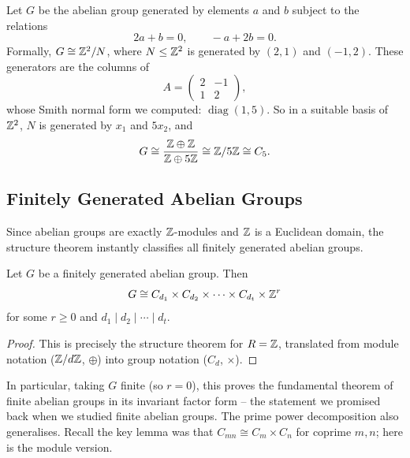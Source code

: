 \documentclass[a4paper]{scrartcl}
\begin{document}
\begin{example}
	Let $G$ be the abelian group generated by elements $a$ and $b$ subject to the relations
	$$
	2a + b = 0, \qquad -a + 2b = 0.
	$$
	Formally, $G \cong \mathbb{Z}^2/N$, where $N \leq \mathbb{Z}^2$ is generated by $(2, 1)$ and $(-1, 2)$. These generators are the columns of
	$$
	A = \begin{pmatrix} 2 & -1 \\ 1 & 2 \end{pmatrix},
	$$
	whose Smith normal form we computed: $\operatorname{diag}(1, 5)$. So in a suitable basis of $\mathbb{Z}^2$, $N$ is generated by $x_1$ and $5x_2$, and
	$$
	G \cong \frac{\mathbb{Z} \oplus \mathbb{Z}}{\mathbb{Z} \oplus 5\mathbb{Z}} \cong \mathbb{Z}/5\mathbb{Z} \cong C_5.
	$$
\end{example}

\subsection{Finitely Generated Abelian Groups}

Since abelian groups are exactly $\mathbb{Z}$-modules and $\mathbb{Z}$ is a Euclidean domain, the structure theorem instantly classifies all finitely generated abelian groups.

\begin{theorem}
	Let $G$ be a finitely generated abelian group. Then
	$$
	G \cong C_{d_1} \times C_{d_2} \times \cdots \times C_{d_t} \times \mathbb{Z}^r
	$$
	for some $r \geq 0$ and $d_1 \mid d_2 \mid \cdots \mid d_t$.
\end{theorem}
\begin{proof}
	This is precisely the structure theorem for $R = \mathbb{Z}$, translated from module notation ($\mathbb{Z}/d\mathbb{Z}$, $\oplus$) into group notation ($C_d$, $\times$).
\end{proof}

In particular, taking $G$ finite (so $r = 0$), this proves the fundamental theorem of finite abelian groups in its invariant factor form -- the statement we promised back when we studied finite abelian groups. The prime power decomposition also generalises. Recall the key lemma was that $C_{mn} \cong C_m \times C_n$ for coprime $m, n$; here is the module version.
\end{document}
